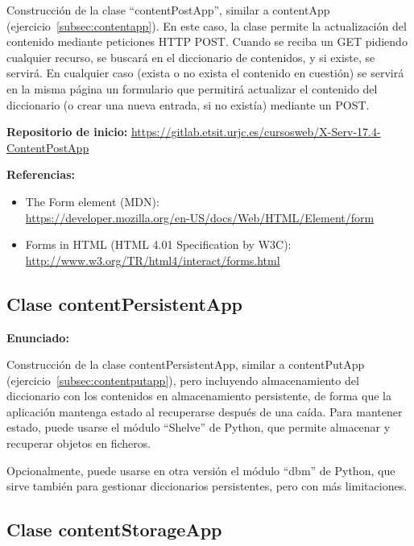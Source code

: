 {Construcción de la clase ``contentPostApp'', similar a contentApp (ejercicio~\ref{subsec:contentapp}). En este caso, la clase permite la actualización del contenido mediante peticiones HTTP POST. Cuando se reciba un GET pidiendo cualquier recurso, se buscará en el diccionario de contenidos, y si existe, se servirá. En cualquier caso (exista o no exista el contenido en cuestión) se servirá en la misma página un formulario que permitirá actualizar el contenido del diccionario (o crear una nueva entrada, si no existía) mediante un POST.

\textbf{Repositorio de inicio:} \url{https://gitlab.etsit.urjc.es/cursosweb/X-Serv-17.4-ContentPostApp}

\textbf{Referencias:}

\begin{itemize}
\item The Form element (MDN): \\
  \url{https://developer.mozilla.org/en-US/docs/Web/HTML/Element/form}
\item Forms in HTML (HTML 4.01 Specification by W3C): \\
\url{http://www.w3.org/TR/html4/interact/forms.html}
\end{itemize}

\subsection{Clase contentPersistentApp}
\label{subsec:contentpersistentapp}

\textbf{Enunciado:}

Construcción de la clase contentPersistentApp, similar a contentPutApp (ejercicio~\ref{subsec:contentputapp}), pero incluyendo almacenamiento del diccionario con los contenidos en almacenamiento persistente, de forma que la aplicación mantenga estado al recuperarse después de una caída. Para mantener estado, puede usarse el módulo ``Shelve'' de Python, que permite almacenar y recuperar objetos en ficheros.

Opcionalmente, puede usarse en otra versión el módulo ``dbm'' de Python, que sirve también para gestionar diccionarios persistentes, pero con más limitaciones.

\subsection{Clase contentStorageApp}
\label{subsec:contentstorageapp}

}
